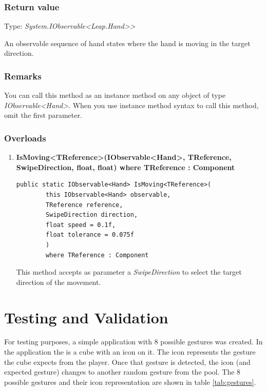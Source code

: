 \documentclass[12pt,a4paper,twoside]{report}
\begin{document}
\subsection{Return value}
Type: \textit{System.IObservable<Leap.Hand>{}>}

An observable sequence of hand states where the hand is moving in the target direction.

\subsection{Remarks}
You can call this method as an instance method on any object of type \textit{IObservable<Hand>}. When you use instance method syntax to call this method, omit the first parameter.

\subsection{Overloads}
\begin{enumerate}
    \item \textbf{IsMoving<TReference>(IObservable<Hand>, TReference, SwipeDirection, float, float) where TReference : Component}
\begin{lstlisting}[caption=Declaration]
     public static IObservable<Hand> IsMoving<TReference>(
        this IObservable<Hand> observable,
        TReference reference,
        SwipeDirection direction,
        float speed = 0.1f,
        float tolerance = 0.075f
        ) 
        where TReference : Component
\end{lstlisting}
    This method accepts as parameter a \textit{SwipeDirection} to select the target direction of the movement.
\end{enumerate}

\newpage


\chapter{Testing and Validation}

For testing purposes, a simple application with 8 possible gestures was created. In the application the is a cube with an icon on it. The icon represents the gesture the cube expects from the player. Once that gesture is detected, the icon (and expected gesture) changes to another random gesture from the pool. The 8 possible gestures and their icon representation are shown in table \ref{tab:gestures}.
\end{document}
